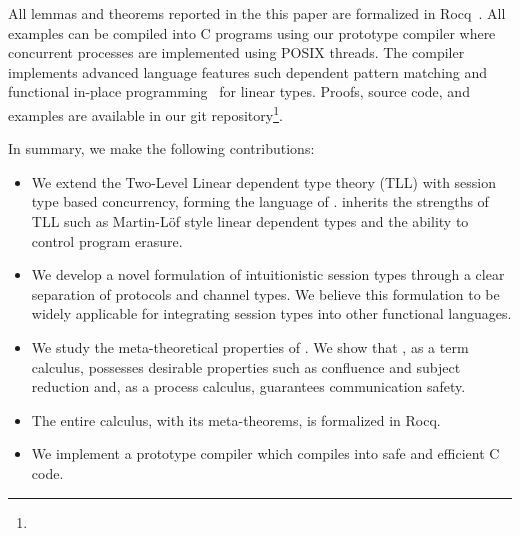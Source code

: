 All lemmas and theorems reported in the this paper are formalized in
Rocq~\cite{coq}. All examples can be compiled into C programs using our prototype
compiler where concurrent processes are implemented using POSIX threads.  The
compiler implements advanced language features such dependent pattern matching
and functional in-place programming~\cite{lorenzen23} for linear types. Proofs,
source code, and examples are available in our git repository\footnote{\TODO}.

In summary, we make the following contributions:
\begin{itemize}
  \item We extend the Two-Level Linear dependent type theory (TLL) with session
        type based concurrency, forming the language of \TLLC{}. \TLLC{} inherits the
        strengths of TLL such as Martin-L\"{o}f style linear dependent types and the
        ability to control program erasure.
  \item We develop a novel formulation of intuitionistic session types
        through a clear separation of protocols and channel types. We believe
        this formulation to be widely applicable for integrating session types into
        other functional languages.
  \item We study the meta-theoretical properties of \TLLC{}. We show that
        \TLLC{}, as a term calculus, possesses desirable properties such as confluence and
        subject reduction and, as a process calculus, guarantees communication safety.
  \item The entire calculus, with its meta-theorems, is formalized in Rocq.
  \item We implement a prototype compiler which compiles \TLLC{} into safe and
        efficient C code.
\end{itemize}


